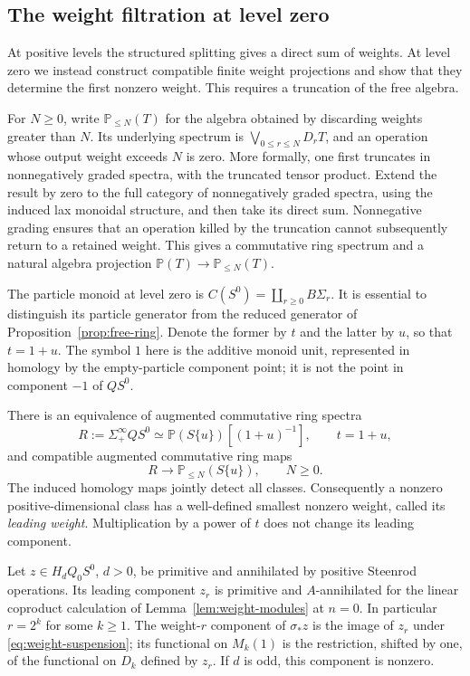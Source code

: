 \subsection{The weight filtration at level zero}

At positive levels the structured splitting gives a direct sum of
weights. At level zero we instead construct compatible finite weight
projections and show that they determine the first nonzero weight.
This requires a truncation of the free algebra.

For $N\geq0$, write $\mathbb P_{\leq N}(T)$ for the algebra obtained by
discarding weights greater than $N$. Its underlying spectrum is
$\bigvee_{0\leq r\leq N}D_rT$, and an operation whose output weight exceeds
$N$ is zero. More formally, one first truncates in nonnegatively graded
spectra, with the truncated tensor product. Extend the result by zero
to the full category of nonnegatively graded spectra, using the
induced lax monoidal structure, and then take its direct sum.
Nonnegative grading ensures that an operation killed
by the truncation cannot subsequently return to a retained weight. This
gives a commutative ring spectrum and a natural algebra projection
$\mathbb P(T)\to\mathbb P_{\leq N}(T)$.

The particle monoid at level zero is
$C(S^0)=\coprod_{r\geq0}B\Sigma_r$. It is essential to distinguish
its particle generator from the reduced generator of
Proposition~\ref{prop:free-ring}. Denote the former by $t$ and the
latter by $u$, so that $t=1+u$. The symbol $1$ here is the additive
monoid unit, represented in homology by the empty-particle component
point; it is not the point in component $-1$ of $QS^0$.

\begin{lemma}\label{lem:zero-weights}
There is an equivalence of augmented commutative ring spectra
\begin{equation}\label{eq:zero-localization}
 R:=\Sigma^\infty_+QS^0
   \simeq\mathbb P(S\{u\})[(1+u)^{-1}],\qquad t=1+u,
\end{equation}
and compatible augmented commutative ring maps
\begin{equation}\label{eq:weight-projections}
 R\longrightarrow\mathbb P_{\leq N}(S\{u\}),\qquad N\geq0.
\end{equation}
The induced homology maps jointly detect all classes. Consequently a
nonzero positive-dimensional class has a well-defined smallest
nonzero weight, called its \emph{leading weight}. Multiplication by
a power of $t$ does not change its leading component.

Let $z\in H_dQ_0S^0$, $d>0$, be primitive and annihilated by positive
Steenrod operations. Its leading component $z_r$ is primitive and
$A$-annihilated for the linear coproduct calculation of
Lemma~\ref{lem:weight-modules} at $n=0$. In particular
$r=2^k$ for some $k\geq1$. The weight-$r$ component of
$\sigma_*z$ is the image of $z_r$ under
\eqref{eq:weight-suspension}; its functional on $M_k(1)$ is the
restriction, shifted by one, of the functional on $D_k$ defined by
$z_r$. If $d$ is odd, this component is nonzero.
\end{lemma}


